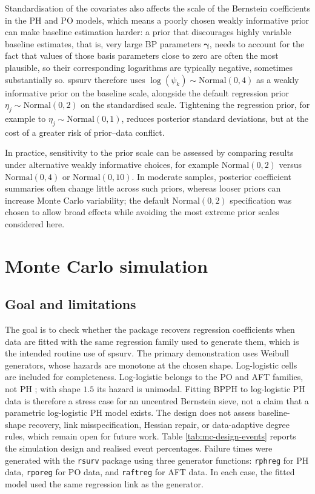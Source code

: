 \documentclass[5p,lefttitle]{elsarticle}
\providecommand{\pkg}[1]{\textsf{#1}}
\begin{document}
{Standardisation of the covariates also affects the scale of the
Bernstein coefficients in the PH and PO models, which means a poorly
chosen weakly informative prior can make baseline estimation harder: a
prior that discourages highly variable baseline estimates, that is,
very large BP parameters \(\boldsymbol{\gamma}\), needs to account for
the fact that values of those basis parameters close to zero are often
the most plausible, so their corresponding logarithms are typically
negative, sometimes substantially so. \pkg{spsurv} therefore uses
\(\log(\psi_k) \sim \mathrm{Normal}(0,4)\) as a weakly informative prior on the
baseline scale, alongside the default regression prior
\(\eta_j \sim \mathrm{Normal}(0,2)\) on the standardised scale. Tightening the
regression prior, for example to \(\eta_j \sim \mathrm{Normal}(0,1)\),
reduces posterior standard deviations, but at the cost of a greater risk
of prior--data conflict.

In practice, sensitivity to the prior scale can be assessed by comparing
results under alternative weakly informative choices, for example
\(\mathrm{Normal}(0,2)\) versus \(\mathrm{Normal}(0,4)\) or
\(\mathrm{Normal}(0,10)\). In moderate samples, posterior coefficient
summaries often change little across such priors, whereas looser priors
can increase Monte Carlo variability; the default \(\mathrm{Normal}(0, 2)\)
specification was chosen to allow broad effects while avoiding the most
extreme prior scales considered here.

\section{Monte Carlo simulation}\label{sec:simulation}

\subsection{Goal and limitations}\label{goal-and-limitations}

The goal is to check whether the package recovers regression coefficients
when data are fitted with the same regression family used to generate them, which is the
intended routine use of \pkg{spsurv}. The primary demonstration uses
Weibull generators, whose hazards are monotone at the chosen shape.
Log-logistic cells are included for completeness. Log-logistic belongs
to the PO and AFT families, not PH \citep{Collett2015}; with shape \(1.5\)
its hazard is unimodal. Fitting BPPH to log-logistic PH data is therefore
a stress case for an uncentred Bernstein sieve, not a claim that a
parametric log-logistic PH model exists. The design does not assess
baseline-shape recovery, link misspecification, Hessian repair, or
data-adaptive degree rules, which remain open for future work.
Table \ref{tab:mc-design-events} reports the simulation design and
realised event percentages. Failure times were generated with the
\texttt{rsurv} package \citep{rsurv} using three generator functions:
\texttt{rphreg} for PH data, \texttt{rporeg} for PO data, and
\texttt{raftreg} for AFT data. In each case, the fitted model used the
same regression link as the generator.

}
\end{document}
